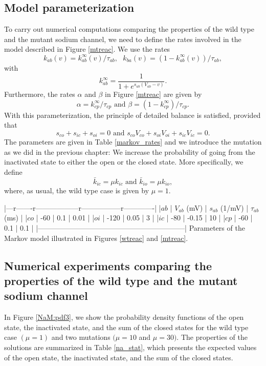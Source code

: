 \subsection{Model parameterization}

To carry out numerical computations comparing the properties
of the  wild type and the mutant sodium channel, we need to define
the rates involved in the model described in Figure \ref{mtreac}. We use the 
rates
\[  k_{ab}(v) = k^{\infty}_{ab}(v)/\tau_{ab}, \ \ \  k_{ba}(v) = (1-k^{\infty}_{ab}(v))/\tau_{ab}, \]
with
\[k^{\infty}_{ab} = \frac{1}{1+e^{s_{a\!b}(V_{a\!b}-v)}}. \]
Furthermore, the rates $\alpha$ and $\beta$ in Figure \ref{mtreac} are given by
\[
\alpha =k^{\infty}_{cp}/\tau_{cp}  \text{ and } \beta =(1-k^{\infty}_{cp})/\tau_{cp}.
\]
With this parameterization, the principle of detailed balance is satisfied, provided that
\[ 
s_{co} + s_{ic} + s_{oi}=0 \mbox{\ \ and\ \ } s_{co}V_{co} + s_{oi}V_{oi} + s_{ic}V_{ic}  =0.  \]
The parameters are given in Table \ref{markov_rates} and we introduce the mutation as we
did in the previous chapter: We increase the probability of going from the
inactivated state to either the open or the closed state. More specifically, we define
\[
\bar{k}_{ic} = \mu k_{ic}  \text{ and } \bar{k}_{io} = \mu k_{io},
\] where, as usual, the wild type case is given by $\mu=1$. 

|---r-------r------------------r-----------------r-------------|
|$ab$ | $V_{ab}$ (mV) | $s_{ab}$ (1/mV) |  $\tau_{ab}$ (ms)    |
|$co$ | -60           | 0.1             |  0.01                |
|$oi$ | -120          | 0.05            |  3                   |
|$ic$ | -80           | -0.15           |  10                  |
|$cp$ | -60           |  0.1            |  0.1                 |
|--------------------------------------------------------------|
Parameters of the Markov model illustrated in Figures \ref{wtreac} 
and \ref{mtreac}. 


\subsection{Numerical experiments comparing the properties of the wild type 
and the mutant sodium channel}



In Figure \ref{NaM:pdf3}, we show the
probability density functions of the open state, the inactivated state, and the
sum of the closed states for the wild type case $(\mu=1)$ and two mutations
$(\mu=10$ and $\mu=30).$ The properties of the solutions are summarized in
Table \ref{na_stat}, which presents the expected values of the open state, the
inactivated state, and the sum of the closed states.


